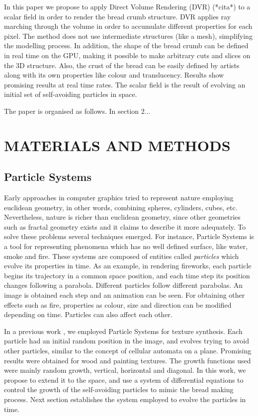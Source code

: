 \documentclass[oneside,a4paper,english,links]{amca}
\begin{document}
In this paper we propose to apply Direct Volume Rendering (DVR) (*cita*) to a scalar field in order to render the bread crumb structure. DVR applies ray marching through the volume in order to accumulate different properties for each pixel. The method does not use intermediate structures (like a mesh), simplifying the modelling process. In addition, the shape of the bread crumb can be defined in real time on the GPU, making it possible to make arbitrary cuts and slices on the 3D structure. Also, the crust of the bread can be easily defined by artists along with its own properties like colour and translucency. Results show promising results at real time rates. The scalar field is the result of evolving an initial set of self-avoiding particles in space. 

The paper is organised as follows. In section 2...

\section{MATERIALS AND METHODS}

\subsection{Particle Systems}

Early approaches in computer graphics tried to represent nature employing euclidean geometry, in other words, combining spheres, cylinders, cubes, etc. Nevertheless, nature is richer than euclidean geometry, since other geometries such as fractal geometry \citep{Mandelbrot83} exists and it claims to describe it more adequately. To solve these problems several techniques emerged. For instance, Particle Systems \citep{Reeves83} is a tool for representing phenomena which has no well defined surface, like water, smoke and fire. These systems are composed of entities called {\em particles} which evolve its properties in time. As an example, in rendering fireworks, each particle begins its trajectory in a common space position, and each time step its position changes following a parabola. Different particles follow different parabolas. An image is obtained each step and an animation can be seen. For obtaining other effects such as fire, properties as colour, size and direction can be modified depending on time. Particles can also affect each other.

In a previous work \citep{Baravalle2011}, we employed Particle Systems for texture synthesis. Each particle had an initial random position in the image, and evolves trying to avoid other particles, similar to the concept of cellular automata on a plane. Promising results were obtained for wood and painting textures. The growth functions used were mainly random growth, vertical, horizontal and diagonal. In this work, we propose to extend it to the space, and use a system of differential equations to control the growth of the self-avoiding particles to mimic the bread making process. Next section establishes the system employed to evolve the particles in time.
\end{document}
